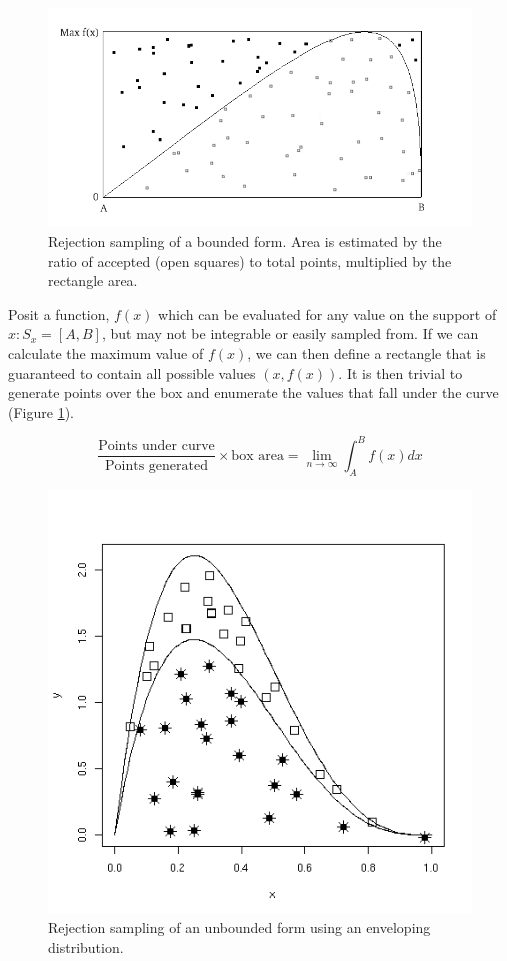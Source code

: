 \documentclass[]{book}
\begin{document}
\begin{figure}[ht]
		\begin{center}
		\includegraphics[scale=0.4]{reject.png}
	\end{center}
	\caption{Rejection sampling of a bounded form. Area is estimated by the ratio of accepted (open squares) to total points, multiplied by the rectangle area.}
	\label{fig:bound}
\end{figure}

Posit a function, $f(x)$ which can be evaluated for any value on the support of $x:S_x = [A,B]$, but may not be integrable or easily sampled from. If we can calculate the maximum  value of $f(x)$, we can then define a rectangle that is guaranteed to contain all possible values $(x,f(x))$. It is then trivial to generate points over the box and enumerate the values that fall under the curve (Figure \ref{fig:bound}).

\[
\frac{\mbox{Points under curve}}{\mbox{Points generated}} \times \mbox{box area} = \lim_{n \to \infty} \int_A^B f(x) dx
\]

\begin{figure}[h]
		\begin{center}
		\includegraphics[scale=0.4]{envelope.png}
	\end{center}
	\caption{Rejection sampling of an unbounded form using an enveloping distribution.}
	\label{fig:unbound}
\end{figure}
\end{document}

